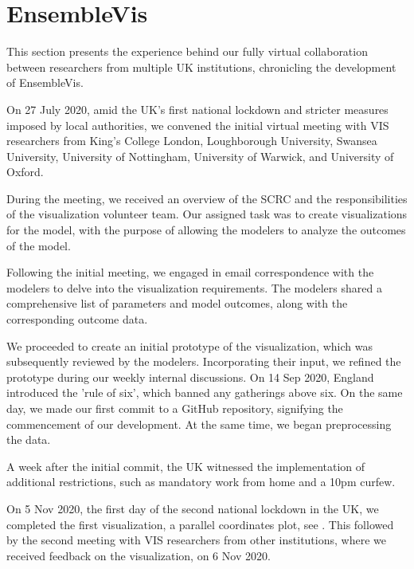 \section{EnsembleVis}
\label{sec:EnsembleVis}

This section presents the experience behind our fully virtual collaboration between researchers from multiple UK institutions, chronicling the development of EnsembleVis.



\label{subsec:InitialMeeting}
On 27 July 2020, amid the UK's first national lockdown and stricter measures imposed by local authorities, we convened the initial virtual meeting with VIS researchers from King's College London, Loughborough University, Swansea University, University of Nottingham, University of Warwick, and University of Oxford.

During the meeting, we received an overview of the SCRC and the responsibilities of the visualization volunteer team.
Our assigned task was to create visualizations for the model, with the purpose of allowing the modelers to analyze the outcomes of the model.

Following the initial meeting, we engaged in email correspondence with the modelers to delve into the visualization requirements. The modelers shared a comprehensive list of parameters and model outcomes, along with the corresponding outcome data.


We proceeded to create an initial prototype of the visualization, which was subsequently reviewed by the modelers.
Incorporating their input, we refined the prototype during our weekly internal discussions.
On 14 Sep 2020, England introduced the 'rule of six', which banned any gatherings above six.
On the same day, we made our first commit to a GitHub repository, signifying the commencement of our development.
At the same time, we began preprocessing the data.

A week after the initial commit, the UK witnessed the implementation of additional restrictions, such as mandatory work from home and a 10pm curfew.


On 5 Nov 2020, the first day of the second national lockdown in the UK, we completed the first visualization, a parallel coordinates plot, see .
This followed by the second meeting with VIS researchers from other institutions, where we received feedback on the visualization, on 6 Nov 2020.

